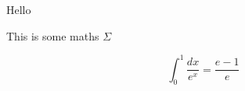 \documentclass{article}
\begin{document}
Hello

This is some maths $\Sigma$

\[ \int_0^1 \frac{dx}{e^x} = \frac{e-1}{e} \]
\end{document}
